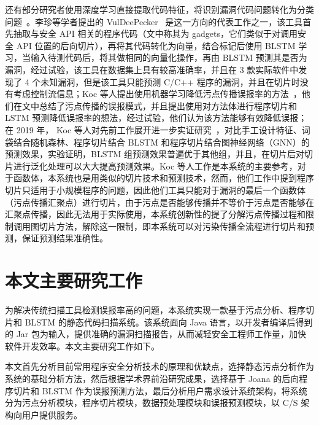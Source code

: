 还有部分研究者使用深度学习直接提取代码特征，将识别漏洞代码问题转化为分类问题~\cite{vuldeepecker,Koc2017,Koc2019}。李珍等学者提出的 VulDeePecker~\cite{vuldeepecker} 是这一方向的代表工作之一，该工具首先抽取与安全 API 相关的程序代码（文中称其为 gadgets，它们类似于对调用安全 API 位置的后向切片），再将其代码转化为向量，结合标记后使用 BLSTM 学习，当输入待测代码后，将其做相同的向量化操作，再由 BLSTM 预测其是否为漏洞，经过试验，该工具在数据集上具有较高准确率，并且在 3 款实际软件中发现了 4 个未知漏洞，但是该工具只能预测 C/C++ 程序的漏洞，并且在切片时没有考虑控制流信息；Koc 等人提出使用机器学习降低污点传播误报率的方法~\cite{Koc2017}，他们在文中总结了污点传播的误报模式，并且提出使用对方法体进行程序切片和 LSTM 预测降低误报率的想法，经过试验，他们认为该方法能够有效降低误报；在 2019 年， Koc 等人对先前工作展开进一步实证研究~\cite{Koc2019}，对比手工设计特征、词袋结合随机森林、程序切片结合 BLSTM 和程序切片结合图神经网络（GNN）的预测效果，实验证明，BLSTM 组预测效果普遍优于其他组，并且，在切片后对切片进行泛化处理可以大大提高预测效果。Koc 等人工作是本系统的主要参考，对于函数体，本系统也是用类似的切片技术和预测技术，然而，他们工作中提到程序切片只适用于小规模程序的问题，因此他们工具只能对于漏洞的最后一个函数体（污点传播汇聚点）进行切片，由于污点是否能够传播并不等价于污点是否能够在汇聚点传播，因此无法用于实际使用，本系统创新性的提了分解污点传播过程和限制调用图切片方法，解除这一限制，即本系统可以对污染传播全流程进行切片和预测，保证预测结果准确性。



\section{本文主要研究工作}
为解决传统扫描工具检测误报率高的问题，本系统实现一款基于污点分析、程序切片和 BLSTM 的静态代码扫描系统。该系统面向 Java 语言，以开发者编译后得到的 Jar 包为输入，提供准确的漏洞扫描报告，从而减轻安全工程师工作量，加快软件开发效率。本文主要研究工作如下。

本文首先分析目前常用程序安全分析技术的原理和优缺点，选择静态污点分析作为系统的基础分析方法，然后根据学术界前沿研究成果，选择基于 Joana 的后向程序切片和 BLSTM 作为误报预测方法，最后分析用户需求设计系统架构，将系统分为污点分析模块，程序切片模块，数据预处理模块和误报预测模块，以 C/S 架构向用户提供服务。

